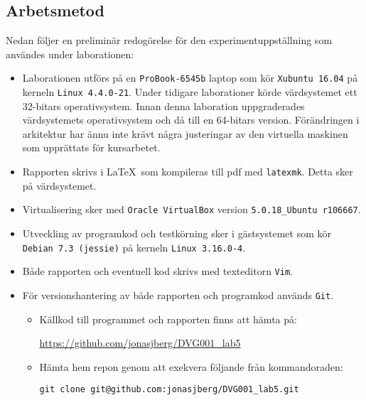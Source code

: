 \subsection{Arbetsmetod}

Nedan följer en preliminär redogörelse för den experimentuppställning som
användes under laborationen:

\begin{itemize}
  \item Laborationen utförs på en \texttt{ProBook-6545b} laptop som kör
        \texttt{Xubuntu 16.04} på kerneln \texttt{Linux 4.4.0-21}.  Under
        tidigare laborationer körde värdsystemet ett 32-bitars operativsystem.
        Innan denna laboration uppgraderades värdsystemets operativsystem och
        då till en 64-bitars version. Förändringen i arkitektur har ännu inte
        krävt några justeringar av den virtuella maskinen som upprättats för
        kursarbetet.

  \item Rapporten skrivs i \LaTeX\  som kompileras till pdf med \texttt{latexmk}.
        Detta sker på värdsystemet.

  \item Virtualisering sker med \texttt{Oracle VirtualBox} version
        \texttt{5.0.18\_Ubuntu r106667}.

  \item Utveckling av programkod och testkörning sker i gästsystemet som kör
        \texttt{Debian 7.3 (jessie)} på kerneln \texttt{Linux 3.16.0-4}.

  \item Både rapporten och eventuell kod skrivs med texteditorn \texttt{Vim}.

  \item För versionshantering av både rapporten och programkod används \texttt{Git}.
    \begin{itemize}
      \item Källkod till programmet och rapporten finns att hämta på:

            \url{https://github.com/jonasjberg/DVG001\_lab5}

      \item Hämta hem repon genom att exekvera följande från kommandoraden:
            
            \texttt{git clone git@github.com:jonasjberg/DVG001\_lab5.git}

    \end{itemize}
\end{itemize}



